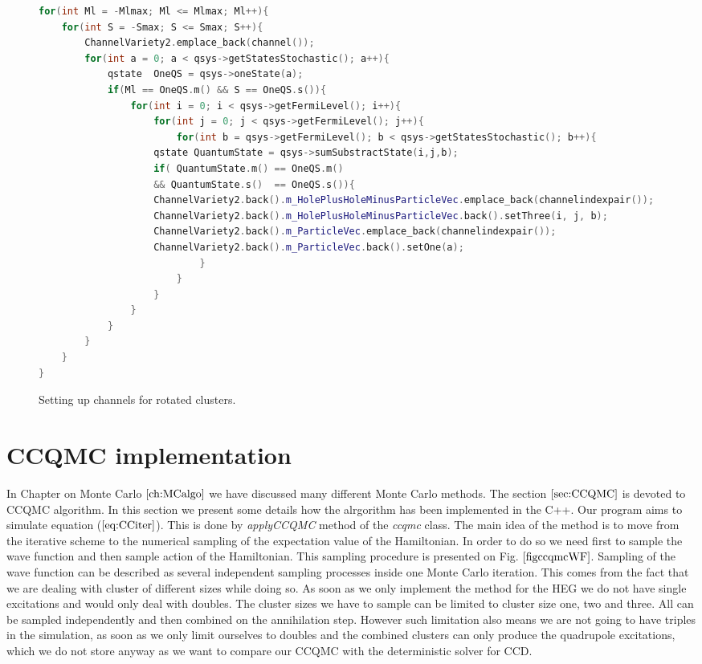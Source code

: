 \begin{figure}
	\begin{lstlisting}[language=C++]
for(int Ml = -Mlmax; Ml <= Mlmax; Ml++){
   	for(int S = -Smax; S <= Smax; S++){
   		ChannelVariety2.emplace_back(channel());
   		for(int a = 0; a < qsys->getStatesStochastic(); a++){
   			qstate  OneQS = qsys->oneState(a);
   			if(Ml == OneQS.m() && S == OneQS.s()){
   				for(int i = 0; i < qsys->getFermiLevel(); i++){
   					for(int j = 0; j < qsys->getFermiLevel(); j++){
  						for(int b = qsys->getFermiLevel(); b < qsys->getStatesStochastic(); b++){
					qstate QuantumState = qsys->sumSubstractState(i,j,b);
					if( QuantumState.m() == OneQS.m()
					&& QuantumState.s()  == OneQS.s()){
					ChannelVariety2.back().m_HolePlusHoleMinusParticleVec.emplace_back(channelindexpair());
					ChannelVariety2.back().m_HolePlusHoleMinusParticleVec.back().setThree(i, j, b);
					ChannelVariety2.back().m_ParticleVec.emplace_back(channelindexpair());
					ChannelVariety2.back().m_ParticleVec.back().setOne(a);
  							}
   						}
   					}
   				}
   			}
   		}
   	}
}
\end{lstlisting}
\caption{Setting up channels for rotated clusters.} \label{f:vectors_for_Q4}
\end{figure}

\section{CCQMC implementation} \label{sec:CCQMCimpl}
In Chapter on Monte Carlo $\ref{ch:MCalgo}$ we have discussed many different Monte Carlo methods. The section $\ref{sec:CCQMC}$ is devoted to CCQMC algorithm. In this section we present some details how the alrgorithm has been implemented in the C++. Our program aims to simulate equation ($\ref{eq:CCiter}$). This is done by \textit{applyCCQMC} method of the \textit{ccqmc} class. The main idea of the method is to move from the iterative scheme to the numerical sampling of the expectation value of the Hamiltonian. In order to do so we need first to sample the wave function and then sample action of the Hamiltonian. This sampling procedure is presented on Fig. $\ref{figccqmcWF}$. Sampling of the wave function can be described as several independent sampling processes inside one Monte Carlo iteration. This comes from the fact that we are dealing with cluster of different sizes while doing so. As soon as we only implement the method for the HEG we do not have single excitations and would only deal with doubles. The cluster sizes we have to sample can be limited to cluster size one, two and three. All can be sampled independently and then combined on the annihilation step. However such limitation also means we are not going to have triples in the simulation, as soon as we only limit ourselves to doubles and the combined clusters can only produce the quadrupole excitations, which we do not store anyway as we want to compare our CCQMC with the deterministic solver for CCD. \\



